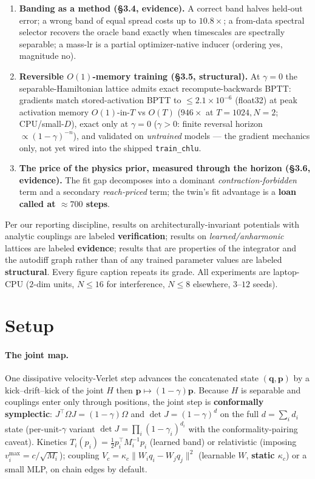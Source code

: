 \documentclass[11pt]{article}
\newcommand{\half}{\tfrac12}
\begin{document}
\begin{enumerate}
\item \textbf{Banding as a method (\S3.4, evidence).} A correct band halves held-out error; a wrong band of equal spread costs up to $10.8\times$; a from-data spectral selector recovers the oracle band exactly when timescales are spectrally separable; a mass-lr is a partial optimizer-native inducer (ordering yes, magnitude no).
\item \textbf{Reversible $O(1)$-memory training (\S3.5, structural).} At $\gamma=0$ the separable-Hamiltonian lattice admits exact recompute-backwards BPTT: gradients match stored-activation BPTT to $\le2.1\times10^{-6}$ (float32) at peak activation memory $O(1)$-in-$T$ vs $O(T)$ ($946\times$ at $T=1024,N=2$; CPU/small-$D$), exact only at $\gamma=0$ ($\gamma>0$: finite reversal horizon $\propto(1-\gamma)^{-n}$), and validated on \emph{untrained} models --- the gradient mechanics only, not yet wired into the shipped \texttt{train\_chlu}.
\item \textbf{The price of the physics prior, measured through the horizon (\S3.6, evidence).} The fit gap decomposes into a dominant \emph{contraction-forbidden} term and a secondary \emph{reach-priced} term; the twin's fit advantage is a \textbf{loan called at $\approx700$ steps}.
\end{enumerate}
Per our reporting discipline, results on architecturally-invariant potentials with analytic couplings are labeled \textbf{verification}; results on \emph{learned/anharmonic} lattices are labeled \textbf{evidence}; results that are properties of the integrator and the autodiff graph rather than of any trained parameter values are labeled \textbf{structural}. Every figure caption repeats its grade. All experiments are laptop-CPU ($2$-dim units, $N\le16$ for interference, $N\le8$ elsewhere, $3$--$12$ seeds).

\section{Setup}
\paragraph{The joint map.} One dissipative velocity-Verlet step advances the concatenated state $(\mathbf q,\mathbf p)$ by a kick--drift--kick of the joint $H$ then $\mathbf p\mapsto(1-\gamma)\mathbf p$. Because $H$ is separable and couplings enter only through positions, the joint step is \textbf{conformally symplectic}: $J^\top\Omega J=(1-\gamma)\Omega$ and $\det J=(1-\gamma)^d$ on the full $d=\sum_i d_i$ state (per-unit-$\gamma$ variant $\det J=\prod_i(1-\gamma_i)^{d_i}$ with the conformality-pairing caveat). Kinetics $T_i(p_i)=\half p_i^\top M_i^{-1}p_i$ (learned band) or relativistic (imposing $v_i^{\max}=c/\sqrt{M_i}$); coupling $V_c=\kappa_c\lVert W_iq_i-W_jq_j\rVert^2$ (learnable $W$, \textbf{static $\kappa_c$}) or a small MLP, on chain edges by default.
\end{document}

